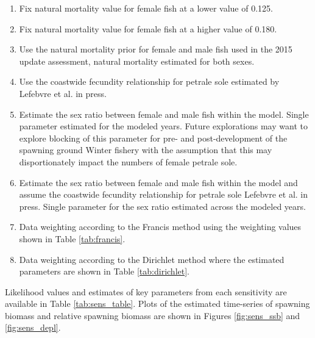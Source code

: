 \documentclass[12pt,]{article}
\begin{document}
\begin{enumerate}

  \item Fix natural mortality value for female fish at a lower value of 0.125.
  
  \item Fix natural mortality value for female fish at a higher value of 0.180.
  
  \item Use the natural mortality prior for female and male fish used in the 2015 update assessment, natural mortality estimated for both sexes.
  
  \item Use the coastwide fecundity relationship for petrale sole estimated by Lefebvre et al. in press.
  
  \item Estimate the sex ratio between female and male fish within the model. Single parameter estimated for the modeled years.  Future explorations may want to explore blocking of this parameter for pre- and post-development of the spawning ground Winter fishery with the assumption that this may disportionately impact the numbers of female petrale sole.
  
  \item Estimate the sex ratio between female and male fish within the model and assume the coastwide fecundity relationship for petrale sole Lefebvre et al. in press. Single parameter for the sex ratio estimated across the modeled years. 
  
  \item Data weighting according to the Francis method using the weighting values shown in Table \ref{tab:francis}. 
  
  \item Data weighting according to the Dirichlet method where the estimated parameters are shown in Table \ref{tab:dirichlet}. 
  
\end{enumerate}

Likelihood values and estimates of key parameters from each sensitivity
are available in Table \ref{tab:sens_table}. Plots of the estimated
time-series of spawning biomass and relative spawning biomass are shown
in Figures \ref{fig:sens_ssb} and \ref{fig:sens_depl}.
\end{document}
